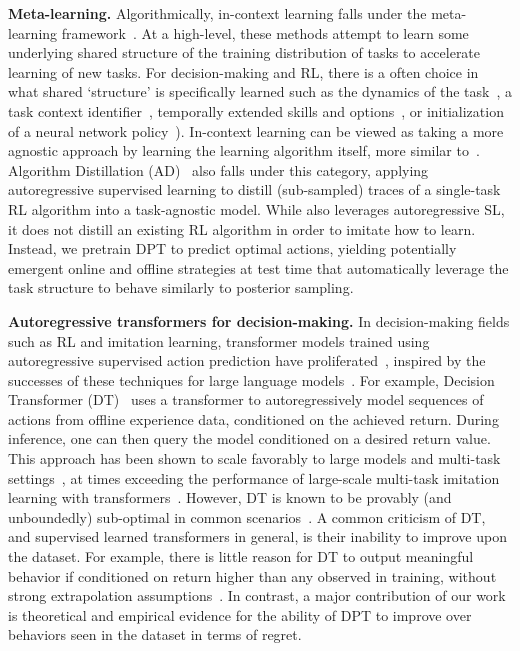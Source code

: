 \documentclass{article}
\begin{document}
\textbf{Meta-learning.} 
Algorithmically, in-context learning falls under the meta-learning framework~\citep{schaul2010metalearning,bengio1990learning}.
At a high-level, these methods attempt to learn some underlying shared structure of the training distribution of tasks 
to accelerate learning of new tasks.
For decision-making and RL, there is a often choice in what shared `structure' is specifically learned such as the dynamics of the task~\citep{fu2016one,nagabandi2018learning,landolfi2019model}, a task context identifier~\citep{rakelly2019efficient,humplik2019meta,zintgraf2019varibad,liu2021decoupling}, temporally extended skills and options~\citep{perkins1999using,gupta2018meta,jiang2022learning}, or initialization of a
neural network policy~\citep{finn2017model,rothfuss2018promp}). In-context learning can be viewed as taking a more agnostic approach by learning the learning algorithm itself, more similar to~\cite{duan2016rl,wang2016learning,mishra2017simple}. 
Algorithm Distillation (AD)~\citep{laskin2022context,lu2023structured} also falls under this category, applying autoregressive supervised learning to distill (sub-sampled) traces of a single-task RL algorithm into a task-agnostic model. 
While \macroName{} also leverages autoregressive SL, it does not distill an existing RL algorithm in order to imitate how to learn. Instead, we pretrain DPT to predict optimal actions, yielding potentially emergent online and offline strategies at test time that automatically leverage the task structure to behave similarly to posterior sampling. 




\textbf{Autoregressive transformers for decision-making.}
In decision-making fields such as RL and imitation learning, transformer models trained using autoregressive supervised action prediction have proliferated~\citep{yang2023foundation}, inspired by the successes of these techniques for large language models~\citep{vaswani2017attention,raffel2020exploring,brown2020language}.
For example, Decision Transformer (DT)~\citep{chen2021decision,janner2021offline} uses a transformer to autoregressively model sequences of actions from offline experience data, conditioned on the achieved return. During inference, one can then query the model conditioned on a desired return value. 
This approach has been shown to scale favorably to large models and multi-task settings~\citep{lee2022multi}, at times exceeding the performance of large-scale multi-task imitation learning with transformers~\citep{reed2022generalist,brohan2022rt,shafiullah2022behavior}.
However, DT is known to be provably (and unboundedly) sub-optimal in common scenarios~\citep{brandfonbrener2022does,yang2022dichotomy}. A common criticism of DT, and supervised learned transformers in general, is their inability to improve upon the dataset. For example, there is little reason for DT to output meaningful behavior if conditioned on return higher than any observed in training, without strong extrapolation assumptions~\citep{brandfonbrener2022does}.
In contrast, a major contribution of our work is theoretical and empirical evidence for the ability of DPT to improve over behaviors seen in the dataset in terms of regret.
\end{document}
